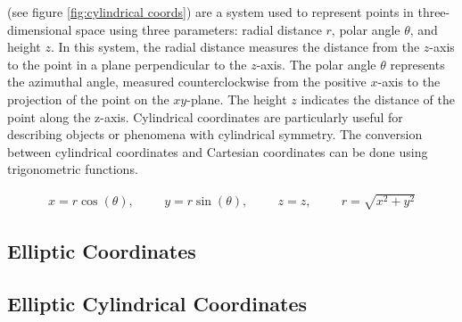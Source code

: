  (see figure \ref{fig:cylindrical coords}) are a system used to represent points in three-dimensional space using three parameters: radial distance $r$, polar angle $\theta$, and height $z$. In this system, the radial distance measures the distance from the $z$-axis to the point in a plane perpendicular to the $z$-axis. The polar angle $\theta$ represents the azimuthal angle, measured counterclockwise from the positive $x$-axis to the projection of the point on the $xy$-plane. The height $z$ indicates the distance of the point along the z-axis. Cylindrical coordinates are particularly useful for describing objects or phenomena with cylindrical symmetry. The conversion between cylindrical coordinates and Cartesian coordinates can be done using trigonometric functions.

\begin{align}	 
	x = r\cos(\theta), \hspace{1cm} y = r\sin(\theta), \hspace{1cm} z = z, \hspace{1cm}	r = \sqrt{x^2 + y^2}
\end{align}








\subsection{Elliptic Coordinates}













\subsection{Elliptic Cylindrical Coordinates}





